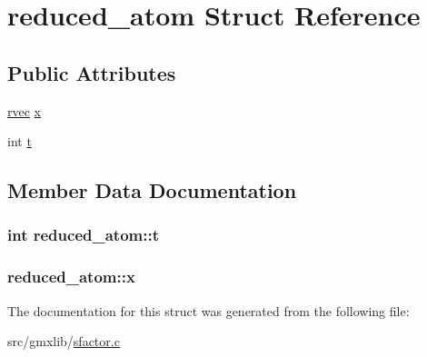 \hypertarget{structreduced__atom}{\section{reduced\-\_\-atom \-Struct \-Reference}
\label{structreduced__atom}
}
\subsection*{\-Public \-Attributes}
\begin{DoxyCompactItemize}
\item 
\hyperlink{share_2template_2gromacs_2types_2simple_8h_aa02a552a4abd2f180c282a083dc3a999}{rvec} \hyperlink{structreduced__atom_aa39de9bc68f05552515442b7b605e58e}{x}
\item 
int \hyperlink{structreduced__atom_a74e0832f7478c6864c23ce8b69815e87}{t}
\end{DoxyCompactItemize}


\subsection{\-Member \-Data \-Documentation}
\hypertarget{structreduced__atom_a74e0832f7478c6864c23ce8b69815e87}{
\subsubsection[{t}]{\setlength{\rightskip}{0pt plus 5cm}int {\bf reduced\-\_\-atom\-::t}}}\label{structreduced__atom_a74e0832f7478c6864c23ce8b69815e87}
\hypertarget{structreduced__atom_aa39de9bc68f05552515442b7b605e58e}{
\subsubsection[{x}]{ {\bf reduced\-\_\-atom\-::x}}}\label{structreduced__atom_aa39de9bc68f05552515442b7b605e58e}


\-The documentation for this struct was generated from the following file\-:\begin{DoxyCompactItemize}
\item 
src/gmxlib/\hyperlink{sfactor_8c}{sfactor.\-c}\end{DoxyCompactItemize}
